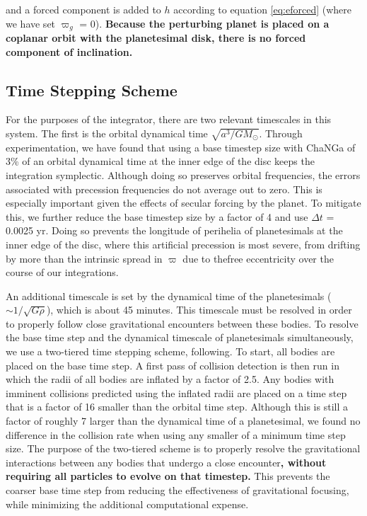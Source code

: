 \noindent and a forced component is added to $h$ according to equation \ref{eq:eforced} (where we have set $\varpi_{g}$ = 0). \textbf{Because the perturbing planet is placed on a coplanar orbit with the planetesimal disk, there is no forced component of inclination.}

\subsection{Time Stepping Scheme}\label{sec:timestep}

For the purposes of the integrator, there are two relevant timescales in this system. The first is the orbital dynamical time 
$\sqrt{a^3/G M_{\odot}}$. Through experimentation, we have found that using a base timestep size with {\sc ChaNGa} of 3\% of 
an orbital dynamical time at the inner edge of the disc keeps the integration symplectic. Although doing so preserves orbital 
frequencies, the errors associated with precession frequencies do not average out to zero. This is especially important given the 
effects of secular forcing by the planet. To mitigate this, we further reduce the base timestep size by a factor of 4 and use $\Delta 
t$ = 0.0025 yr. Doing so prevents the longitude of perihelia of planetesimals at the inner edge of the disc, where this artificial 
precession is most severe, from drifting by more than the intrinsic spread in $\varpi$ due to thefree eccentricity over the course 
of our integrations.

An additional timescale is set by the dynamical time of the planetesimals ($\sim 1/\sqrt{G \rho}$), which is about 45 minutes. This 
timescale must be resolved in order to properly follow close gravitational encounters between these bodies. To resolve the base 
time step and the dynamical timescale of planetesimals simultaneously, we use a two-tiered time stepping scheme, 
following\cite{leinhardt15}. To start, all bodies are placed on the base time step. A first pass of collision detection is then run in 
which the radii of all bodies are inflated by a factor of 2.5. Any bodies with imminent collisions predicted using the inflated radii 
are placed on a time step that is a factor of 16 smaller than the orbital time step. Although this is still a factor of roughly 7 larger 
than the dynamical time of a planetesimal, we found no difference in the collision rate when using any smaller of a minimum time 
step size. The purpose of the two-tiered scheme is to properly resolve the gravitational interactions between any bodies that 
undergo a close encounter\textbf{, without requiring all particles to evolve on that timestep.} This prevents the coarser base time step 
from reducing the effectiveness of gravitational focusing, while minimizing the additional computational expense.


